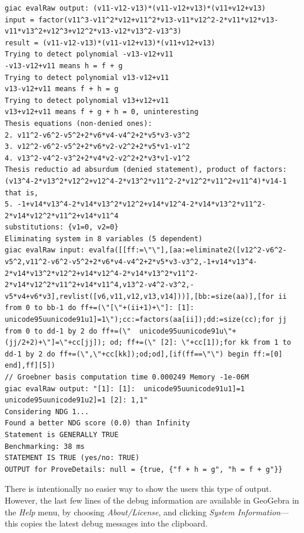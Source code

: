 \documentclass{article}
\begin{document}
{\begin{lstlisting}[language=mylog]
giac evalRaw output: (v11-v12-v13)*(v11-v12+v13)*(v11+v12+v13)
input = factor(v11^3-v11^2*v12+v11^2*v13-v11*v12^2-2*v11*v12*v13-v11*v13^2+v12^3+v12^2*v13-v12*v13^2-v13^3)
result = (v11-v12-v13)*(v11-v12+v13)*(v11+v12+v13)
Trying to detect polynomial -v13-v12+v11
-v13-v12+v11 means h = f + g
Trying to detect polynomial v13-v12+v11
v13-v12+v11 means f + h = g
Trying to detect polynomial v13+v12+v11
v13+v12+v11 means f + g + h = 0, uninteresting
Thesis equations (non-denied ones):
2. v11^2-v6^2-v5^2+2*v6*v4-v4^2+2*v5*v3-v3^2
3. v12^2-v6^2-v5^2+2*v6*v2-v2^2+2*v5*v1-v1^2
4. v13^2-v4^2-v3^2+2*v4*v2-v2^2+2*v3*v1-v1^2
Thesis reductio ad absurdum (denied statement), product of factors:
(v13^4-2*v13^2*v12^2+v12^4-2*v13^2*v11^2-2*v12^2*v11^2+v11^4)*v14-1
that is,
5. -1+v14*v13^4-2*v14*v13^2*v12^2+v14*v12^4-2*v14*v13^2*v11^2-2*v14*v12^2*v11^2+v14*v11^4
substitutions: {v1=0, v2=0}
Eliminating system in 8 variables (5 dependent)
giac evalRaw input: evalfa([[ff:=\"\"],[aa:=eliminate2([v12^2-v6^2-v5^2,v11^2-v6^2-v5^2+2*v6*v4-v4^2+2*v5*v3-v3^2,-1+v14*v13^4-2*v14*v13^2*v12^2+v14*v12^4-2*v14*v13^2*v11^2-2*v14*v12^2*v11^2+v14*v11^4,v13^2-v4^2-v3^2,-v5*v4+v6*v3],revlist([v6,v11,v12,v13,v14]))],[bb:=size(aa)],[for ii from 0 to bb-1 do ff+=(\"[\"+(ii+1)+\"]: [1]:  unicode95uunicode91u1]=1\");cc:=factors(aa[ii]);dd:=size(cc);for jj from 0 to dd-1 by 2 do ff+=(\"  unicode95uunicode91u\"+(jj/2+2)+\"]=\"+cc[jj]); od; ff+=(\" [2]: \"+cc[1]);for kk from 1 to dd-1 by 2 do ff+=(\",\"+cc[kk]);od;od],[if(ff==\"\") begin ff:=[0] end],ff][5])
// Groebner basis computation time 0.000249 Memory -1e-06M
giac evalRaw output: "[1]: [1]:  unicode95uunicode91u1]=1  unicode95uunicode91u2]=1 [2]: 1,1"
Considering NDG 1...
Found a better NDG score (0.0) than Infinity
Statement is GENERALLY TRUE
Benchmarking: 38 ms
STATEMENT IS TRUE (yes/no: TRUE)
OUTPUT for ProveDetails: null = {true, {"f + h = g", "h = f + g"}}
\end{lstlisting}
} %
There is intentionally no easier way to show the users this type of output. However, the last few lines of the debug information are available in GeoGebra in the \textit{Help} menu, by choosing \textit{About/License}, and clicking \textit{System Information}---this copies the latest debug messages into the clipboard.


\end{document}
